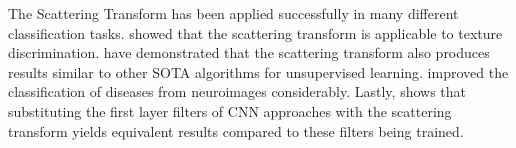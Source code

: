 The Scattering Transform has been applied successfully in many different classification tasks. \cite{InvariantScatteringTextureDiscrimination2013} showed that the scattering transform is applicable to texture discrimination. \cite{DeepRotoTranslation2014} have demonstrated that the scattering transform also produces results similar to other SOTA algorithms for unsupervised learning. \cite{3DScatteringTransformNeuro2017} improved the classification of diseases from neuroimages considerably. Lastly, \cite{ScalingTheScatteringTransform2017} shows that substituting the first layer filters of CNN approaches with the scattering transform yields equivalent results compared to these filters being trained.\\